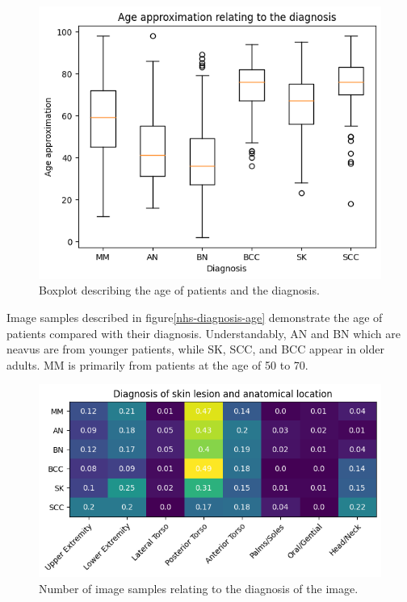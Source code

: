 \begin{figure}
    \centering
    \includegraphics[scale=0.75]{images/nhs/nhs-diagnosis-age.png}
    \caption{Boxplot describing the age of patients and the diagnosis.} 
\end{figure}\label{nhs-diagnosis-age}

Image samples described in figure\ref{nhs-diagnosis-age} demonstrate the age of patients compared with their diagnosis. Understandably, AN and BN which are neavus are from younger patients, while SK, SCC, and BCC appear in older adults. MM is primarily from patients at the age of 50 to 70.

\begin{figure}
    \centering
    \includegraphics[scale=0.75]{images/nhs/nhs-location-diagnosis.png}
    \caption{Number of image samples relating to the diagnosis of the image.} 
\end{figure}\label{nhs-location-diagnosis}

